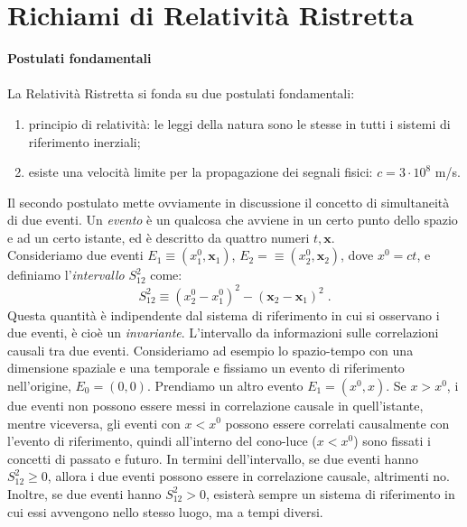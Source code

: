 \documentclass[12pt,a4paper]{report}
\theoremstyle{definition}
\begin{document}
\chapter*{Richiami di Relatività Ristretta}
\textbf{Postulati fondamentali} \\
\\
La Relatività Ristretta si fonda su due postulati fondamentali:
\begin{enumerate}
\item principio di relatività: le leggi della natura sono le stesse in tutti i sistemi di riferimento inerziali;
\item esiste una velocità limite per la propagazione dei segnali fisici: $c=3\cdot 10^8$ m/s.
\end{enumerate}
Il secondo postulato mette ovviamente in discussione il concetto di simultaneità di due eventi. Un \emph{evento} è un qualcosa che avviene in un certo punto dello spazio e ad un certo istante, ed è descritto da quattro numeri $t,\mathbf{x}$. \\
Consideriamo due eventi $E_1\equiv(x_1^0,\mathbf{x}_1)$, $E_2=\equiv(x_2^0,\mathbf{x}_2)$, dove $x^0=ct$, e definiamo l'\emph{intervallo} $S_{12}^2$ come:
\begin{equation}
S_{12}^2\equiv (x_2^0-x_1^0)^2-(\mathbf{x}_2-\mathbf{x}_1)^2\;.
\end{equation}
Questa quantità è indipendente dal sistema di riferimento in cui si osservano i due eventi, è cioè un \emph{invariante}. L'intervallo da informazioni sulle correlazioni causali tra due eventi. Consideriamo ad esempio lo spazio-tempo con una dimensione spaziale e una temporale e fissiamo un evento di riferimento nell'origine, $E_0=(0,0)$. Prendiamo un altro evento $E_1=(x^0,x)$. Se $x>x^0$, i due eventi non possono essere messi in correlazione causale in quell'istante, mentre viceversa, gli eventi con $x<x^0$ possono essere correlati causalmente con l'evento di riferimento, quindi all'interno del cono-luce ($x<x^0$) sono fissati i concetti di passato e futuro. In termini dell'intervallo, se due eventi hanno $S_{12}^2\ge 0$, allora i due eventi possono essere in correlazione causale, altrimenti no. Inoltre, se due eventi hanno $S_{12}^2>0$, esisterà sempre un sistema di riferimento in cui essi avvengono nello stesso luogo, ma a tempi diversi. \\
\end{document}
